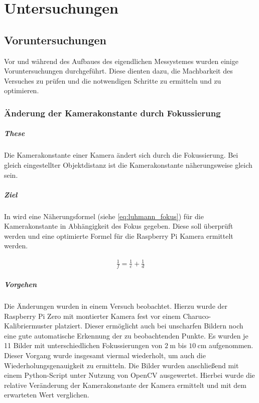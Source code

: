 \documentclass[./00PhotoBox.tex]{subfiles}
\begin{document}
\chapter{Untersuchungen}

\section{Voruntersuchungen}
Vor und während des Aufbaues des eigendlichen Messystemes wurden einige Voruntersuchungen durchgeführt. Diese dienten dazu, die Machbarkeit des Versuches zu prüfen und die notwendigen Schritte zu ermitteln und zu optimieren.




\subsection{Änderung der Kamerakonstante durch Fokussierung}

\paragraph{These}
Die Kamerakonstante einer Kamera ändert sich durch die Fokussierung. Bei gleich eingestellter Objektdistanz ist die Kamerakonstante näherungsweise gleich sein.

\paragraph{Ziel}
In \citet[S. 146]{luhmann} wird eine Näherungsformel (siehe \autoref{eq:luhmann_fokus}) für die \Gls{Kamerakonstante} in Abhängigkeit des Fokus gegeben. Diese soll überprüft werden und eine optimierte Formel für die Raspberry Pi Kamera ermittelt werden.

\begin{align}
    \frac{1}{f} = \frac{1}{c} + \frac{1}{d}
    \label{eq:luhmann_fokus}
\end{align}

\paragraph{Vorgehen}
Die Änderungen wurden in einem Versuch beobachtet. Hierzu wurde der Raspberry Pi Zero mit montierter Kamera fest vor einem Charuco-Kalibriermuster platziert. Dieser ermöglicht auch bei unscharfen Bildern noch eine gute automatische Erkennung der zu beobachtenden Punkte. Es wurden je 11 Bilder mit unterschiedlichen Fokussierungen von $2~\text{m}$ bis  $10~\text{cm}$ aufgenommen. Dieser Vorgang wurde insgesamt viermal wiederholt, um auch die Wiederholungsgenauigkeit zu ermitteln. Die Bilder wurden anschließend mit einem Python-Script unter Nutzung von OpenCV ausgewertet. Hierbei wurde die relative Veränderung der Kamerakonstante der Kamera ermittelt und mit dem erwarteten Wert verglichen.
\end{document}
